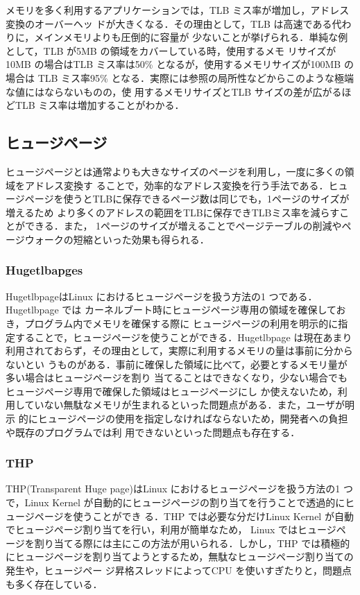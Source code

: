 メモリを多く利用するアプリケーションでは，TLB ミス率が増加し，アドレス変換のオーバーヘッ
ドが大きくなる．その理由として，TLB は高速である代わりに，メインメモリよりも圧倒的に容量が
少ないことが挙げられる．単純な例として，TLB が5MB の領域をカバーしている時，使用するメモ
リサイズが10MB の場合はTLB ミス率は50\% となるが，使用するメモリサイズが100MB の場合は
TLB ミス率95\% となる．実際には参照の局所性などからこのような極端な値にはならないものの，使
用するメモリサイズとTLB サイズの差が広がるほどTLB ミス率は増加することがわかる．

\subsection{ヒュージページ}
ヒュージページとは通常よりも大きなサイズのページを利用し，一度に多くの領域をアドレス変換す
ることで，効率的なアドレス変換を行う手法である．ヒュージページを使うとTLBに保存できるページ数は同じでも，1ページのサイズが増えるため
より多くのアドレスの範囲をTLBに保存できTLBミス率を減らすことができる．また，
1ページのサイズが増えることでページテーブルの削減やページウォークの短縮といった効果も得られる．

\subsubsection{Hugetlbapges}
Hugetlbpage\cite{document-hugetlbpage}はLinux におけるヒュージページを扱う方法の1 つである．Hugetlbpage では
カーネルブート時にヒュージページ専用の領域を確保しておき，プログラム内でメモリを確保する際に
ヒュージページの利用を明示的に指定することで，ヒュージページを使うことができる．Hugetlbpage
は現在あまり利用されておらず，その理由として，実際に利用するメモリの量は事前に分からないとい
うものがある．事前に確保した領域に比べて，必要とするメモリ量が多い場合はヒュージページを割り
当てることはできなくなり，少ない場合でもヒュージページ専用で確保した領域はヒュージページにし
か使えないため，利用していない無駄なメモリが生まれるといった問題点がある．また，ユーザが明示
的にヒュージページの使用を指定しなければならないため，開発者への負担や既存のプログラムでは利
用できないといった問題点も存在する．
\subsubsection{THP}
THP(Transparent Huge page)\cite{document-thp}はLinux におけるヒュージページを扱う方法の1 つで，Linux
Kernel が自動的にヒュージページの割り当てを行うことで透過的にヒュージページを使うことができ
る．THP では必要な分だけLinux Kernel が自動でヒュージページ割り当てを行い，利用が簡単なため，
Linux ではヒュージページを割り当てる際には主にこの方法が用いられる．しかし，THP では積極的
にヒュージページを割り当てようとするため，無駄なヒュージページ割り当ての発生や，ヒュージペー
ジ昇格スレッドによってCPU を使いすぎたりと，問題点も多く存在している．

